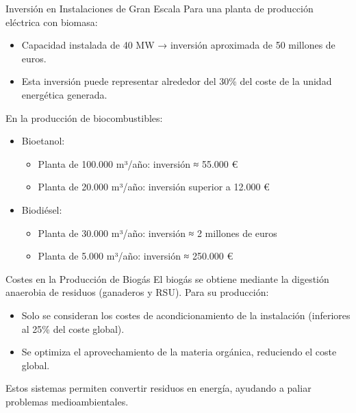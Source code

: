 \documentclass[../../main.tex]{subfiles}
\begin{document}
\begin{frame}{Inversión en Instalaciones de Gran Escala}
\justifying
Para una planta de producción eléctrica con biomasa:
\begin{itemize}
  \item Capacidad instalada de 40 MW → inversión aproximada de 50 millones de euros.
  \item Esta inversión puede representar alrededor del 30\% del coste de la unidad energética generada.
\end{itemize}

\vspace{0.5em}
En la producción de biocombustibles:
\begin{itemize}
  \item Bioetanol: 
    \begin{itemize}
      \item Planta de 100.000 m³/año: inversión ≈ 55.000 €
      \item Planta de 20.000 m³/año: inversión superior a 12.000 €
    \end{itemize}
  \item Biodiésel:
    \begin{itemize}
      \item Planta de 30.000 m³/año: inversión ≈ 2 millones de euros
      \item Planta de 5.000 m³/año: inversión ≈ 250.000 €
    \end{itemize}
\end{itemize}
\end{frame}
\begin{frame}{Costes en la Producción de Biogás}
\justifying
El biogás se obtiene mediante la digestión anaerobia de residuos (ganaderos y RSU).  
Para su producción:
\begin{itemize}
  \item Solo se consideran los costes de acondicionamiento de la instalación (inferiores al 25\% del coste global).
  \item Se optimiza el aprovechamiento de la materia orgánica, reduciendo el coste global.
\end{itemize}

\vspace{0.5em}
Estos sistemas permiten convertir residuos en energía, ayudando a paliar problemas medioambientales.
\end{frame}
\end{document}

